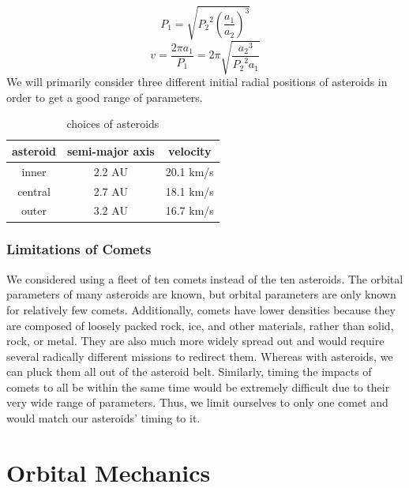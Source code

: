 \documentclass[a4paper]{article}
\begin{document}
  \[P_1 = \sqrt{{P_2}^2 \left(\dfrac{a_1}{a_2}\right)^{\!\!3}}\]
  \[v = \dfrac{2\pi a_1}{P_1} = 2\pi \sqrt{\dfrac{{a_2}^3}{{P_2}^2 a_1}}\]
  We will primarily consider three different initial radial positions of asteroids in order to get a good range of parameters.
  \begin{table}[ht]
  \centering
  \caption{choices of asteroids}
  \label{}
  \begin{tabular}{c|c|c}
  asteroid & semi-major axis & velocity \\ \hline
  inner      & 2.2 AU & 20.1 km/s \\ \hline
  central      & 2.7 AU & 18.1 km/s \\ \hline
  outer      & 3.2 AU & 16.7 km/s
  \end{tabular}
  \end{table}

  \subsubsection{Limitations of Comets}
  We considered using a fleet of ten comets instead of the ten asteroids. The orbital parameters of many asteroids are known, but orbital parameters are only known for relatively few comets. Additionally, comets have lower densities because they are composed of loosely packed rock, ice, and other materials, rather than solid, rock, or metal. They are also much more widely spread out and would require several radically different missions to redirect them. Whereas with asteroids, we can pluck them all out of the asteroid belt. Similarly, timing the impacts of comets to all be within the same time would be extremely difficult due to their very wide range of parameters. Thus, we limit ourselves to only one comet and would match our asteroids' timing to it.

	\section{Orbital Mechanics}
\end{document}

